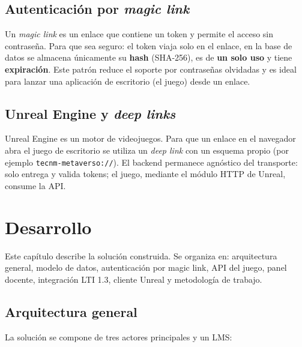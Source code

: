\documentclass[12pt,letterpaper,oneside]{report}
\begin{document}
\section{Autenticación por \emph{magic link}}
Un \emph{magic link} es un enlace que contiene un token y permite el acceso sin
contraseña. Para que sea seguro: el token viaja solo en el enlace, en la base de
datos se almacena únicamente su \textbf{hash} (SHA-256), es de \textbf{un solo
uso} y tiene \textbf{expiración}. Este patrón reduce el soporte por contraseñas
olvidadas y es ideal para lanzar una aplicación de escritorio (el juego) desde un
enlace.

\section{Unreal Engine y \emph{deep links}}
Unreal Engine es un motor de videojuegos. Para que un enlace en el navegador
abra el juego de escritorio se utiliza un \emph{deep link} con un esquema propio
(por ejemplo \texttt{tecnm-metaverso://}). El backend permanece agnóstico del
transporte: solo entrega y valida tokens; el juego, mediante el módulo HTTP de
Unreal, consume la API.

\chapter{Desarrollo}

Este capítulo describe la solución construida. Se organiza en: arquitectura
general, modelo de datos, autenticación por magic link, API del juego, panel
docente, integración LTI 1.3, cliente Unreal y metodología de trabajo.

\section{Arquitectura general}
La solución se compone de tres actores principales y un LMS:
\end{document}

